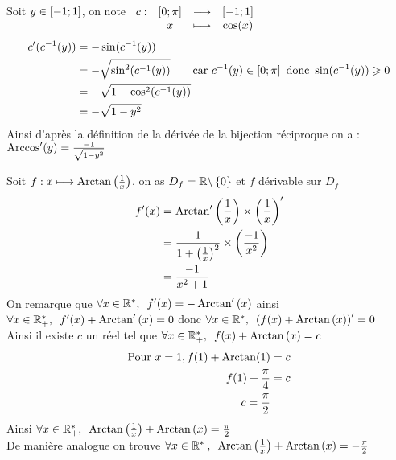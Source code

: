 \begin{dem}
	Soit \(y\in\left[-1;1\right]\), on note \(\begin{array}[t]{cccc}c : & \left[0;\pi\right] & \longrightarrow & \left[-1;1\right] \\ & x & \longmapsto & \cos(x)\end{array}\)
	\begin{align*}
		c'(c^{-1}(y)) & = -\sin(c^{-1}(y))                                                                                                \\
		              & = -\sqrt{\sin^2(c^{-1}(y))} \qquad  \text{car }c^{-1}(y)\in \left[0;\pi\right] \text{ donc } \sin(c^{-1}(y))\geqslant 0 \\
		              & = -\sqrt{1-\cos^2(c^{-1}(y))}                                                                                     \\
		              & = -\sqrt{1-y^2}                                                                                                   \\
	\end{align*}
	Ainsi d'après la définition de la dérivée de la bijection réciproque on a : \(\operatorname{Arccos}'(y) = \frac{-1}{\sqrt{1-y^2}}\)
\end{dem}

\begin{rem}
	Soit \(f:x\longmapsto \operatorname{Arctan}{\left(\frac{1}{x}\right)}\), on as \(D_f = \mathbb{R}\backslash\left\lbrace0\right\rbrace\) et \(f\) dérivable sur \(D_f\)
	\begin{align*}
		f'(x) & = \operatorname{Arctan}'\left(\frac{1}{x}\right) \times \left(\frac{1}{x}\right)'         \\
		      & = \frac{1}{1+\left(\frac{1}{x}\right)^2} \times \left(\frac{-1}{x^2}\right) \\
		      & = \frac{-1}{x^2+1}
	\end{align*}
	On remarque que \(\quantifs{\forall x \in \Rs}f'(x) = -\Arctan'\paren{x}\) ainsi \(\quantifs{\forall x \in \Rps}f'(x) +\Arctan'\paren{x} = 0\) donc \(\quantifs{\forall x \in \Rs}\paren{f(x)+\Arctan\paren{x}}'=0\) \\
	Ainsi il existe \(c\) un réel tel que \(\quantifs{\forall x \in \Rps}f(x) + \Arctan\paren{x} = c\)
	\begin{align*}
		\text{Pour } x = 1, f(1) + \operatorname{Arctan}(1) & = c \\
		f(1) + \frac{\pi}{4}                  & = c \\
		c = \frac{\pi}{2}
	\end{align*}
	Ainsi \(\quantifs{\forall x \in \Rps} \Arctan\paren{\frac{1}{x}} + \Arctan\paren{x} = \frac{\pi}{2}\) \\
	De manière analogue on trouve  \(\quantifs{\forall x \in \Rms} \Arctan\paren{\frac{1}{x}} + \Arctan\paren{x} = -\frac{\pi}{2}\) \\
\end{rem}